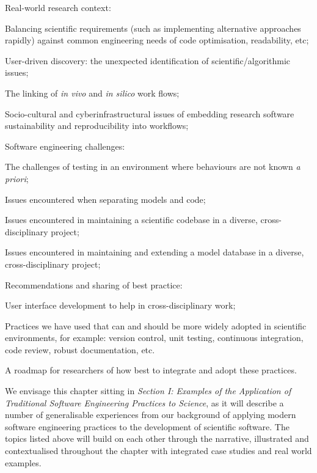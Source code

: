 \documentclass[a4paper,11pt]{article}
\begin{document}
\begin{compactitem}
\item Real-world research context:
\begin{compactitem}
\item Balancing scientific requirements (such as implementing alternative 
	approaches rapidly) against common engineering needs of code optimisation, 
	readability, etc; 
\item User-driven discovery: the unexpected identification of 
	scientific/algorithmic issues;
\item The linking of {\em in vivo} and {\em in silico} work flows;
\item Socio-cultural and cyberinfrastructural issues of embedding research software
  sustainability and reproducibility into workflows;
\end{compactitem}
\item Software engineering challenges:
\begin{compactitem}
\item The challenges of testing in an environment where behaviours 
	are not known \emph{a priori}; 
\item Issues encountered when separating models and code; 
\item Issues encountered in maintaining a scientific codebase in a diverse, 
cross-disciplinary project; 
\item Issues encountered in maintaining and extending a model database
  in a diverse, cross-disciplinary project;
\end{compactitem}
\item Recommendations and sharing of best practice:
\begin{compactitem}
\item User interface development to help in cross-disciplinary work;
\item Practices we have used that can and should be more widely adopted in
  scientific environments, for example: version control, unit testing,
  continuous integration, code review, robust documentation, etc. 
\item A roadmap for researchers of how best to integrate and adopt these practices.\newline
\end{compactitem}
\end{compactitem}

We envisage this chapter sitting in {\emph{Section I: Examples of the
Application of Traditional Software Engineering Practices to
Science}}, as it will describe a number of generalisable experiences
from our background of applying modern software engineering practices
to the development of scientific software. The topics listed above
will build on each other through the narrative, illustrated and
contextualised throughout the chapter with integrated case studies and
real world examples.
\end{document}
